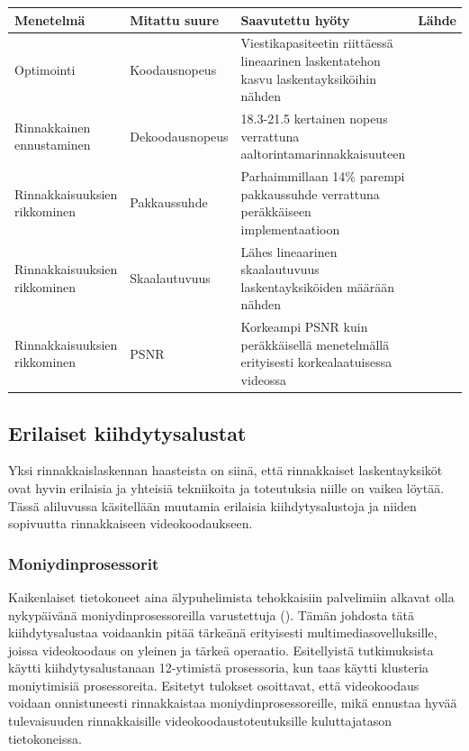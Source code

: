 \begin{center}
\begin{tabular}{| p{} | p{}| p{}| p{}|}
	\hline
	Menetelmä & Mitattu suure & Saavutettu hyöty & Lähde \\
	\hline\hline
	Optimointi & Koodausnopeus & Viestikapasiteetin riittäessä lineaarinen laskentatehon kasvu laskentayksiköihin nähden
			\citealt{li}& \\
	\hline
	Rinnakkainen ennustaminen & Dekoodausnopeus &
			18.3-21.5 kertainen nopeus verrattuna aaltorintamarinnakkaisuuteen & \citealt{pieters} \\
	\hline
	Rinnakkaisuuksien rikkominen & Pakkaussuhde & Parhaimmillaan 14\% parempi pakkaussuhde verrattuna
			peräkkäiseen implementaatioon & \citealt{xu} \\
	\hline
	Rinnakkaisuuksien rikkominen & Skaalautuvuus & Lähes lineaarinen skaalautuvuus laskentayksiköiden määrään nähden &
			\citealt{xu} \\
	\hline
	Rinnakkaisuuksien rikkominen & PSNR & Korkeampi PSNR kuin peräkkäisellä menetelmällä erityisesti korkealaatuisessa videossa
			\citealt{xu}& \\
	\hline
\end{tabular}
\end{center}

\subsection{Erilaiset kiihdytysalustat}

Yksi rinnakkaislaskennan haasteista on siinä, että rinnakkaiset laskentayksiköt
ovat hyvin erilaisia ja yhteisiä tekniikoita ja toteutuksia niille on vaikea
löytää. Tässä aliluvussa käsitellään muutamia erilaisia kiihdytysalustoja ja
niiden sopivuutta rinnakkaiseen videokoodaukseen.

\subsubsection{Moniydinprosessorit}

Kaikenlaiset tietokoneet aina älypuhelimista tehokkaisiin palvelimiin alkavat
olla nykypäivänä moniydinprosessoreilla varustettuja (\citealt{choi}). Tämän
johdosta tätä kiihdytysalustaa voidaankin pitää tärkeänä erityisesti
multimediasovelluksille, joissa videokoodaus on yleinen ja tärkeä operaatio.
Esitellyistä tutkimuksista \citealt{chi} käytti kiihdytysalustanaan 12-ytimistä
prosessoria, kun taas \citealt{li} käytti klusteria moniytimisiä prosessoreita.
Esitetyt tulokset osoittavat, että videokoodaus voidaan onnistuneesti
rinnakkaistaa moniydinprosessoreille, mikä ennustaa hyvää tulevaisuuden
rinnakkaisille videokoodaustoteutuksille kuluttajatason tietokoneissa.

